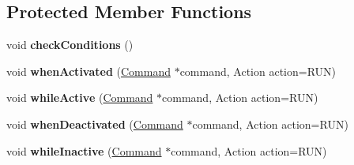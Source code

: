 \subsection*{Protected Member Functions}
\begin{DoxyCompactItemize}
\item 
\mbox{\label{classlib_iterative_robot_1_1_trigger_ac89c07cd514a1af516dd7f773cbedcab}} 
void {\bfseries check\+Conditions} ()
\item 
\mbox{\label{classlib_iterative_robot_1_1_trigger_af36fbbe12844b62498a1c48593e75c92}} 
void {\bfseries when\+Activated} (\mbox{\hyperlink{classlib_iterative_robot_1_1_command}{Command}} $\ast$command, Action action=R\+UN)
\item 
\mbox{\label{classlib_iterative_robot_1_1_trigger_a7de1ef016c285eb489e0f74e579fce84}} 
void {\bfseries while\+Active} (\mbox{\hyperlink{classlib_iterative_robot_1_1_command}{Command}} $\ast$command, Action action=R\+UN)
\item 
\mbox{\label{classlib_iterative_robot_1_1_trigger_af4b9afc4013722d4e3492d3c9ed97fdd}} 
void {\bfseries when\+Deactivated} (\mbox{\hyperlink{classlib_iterative_robot_1_1_command}{Command}} $\ast$command, Action action=R\+UN)
\item 
\mbox{\label{classlib_iterative_robot_1_1_trigger_a90128b3d0b6b0ccae96cd0fd0472c85b}} 
void {\bfseries while\+Inactive} (\mbox{\hyperlink{classlib_iterative_robot_1_1_command}{Command}} $\ast$command, Action action=R\+UN)
\end{DoxyCompactItemize}
